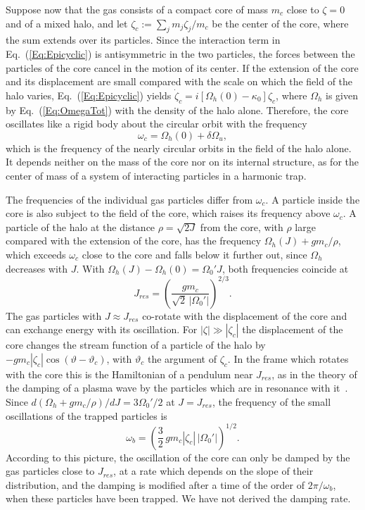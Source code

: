 Suppose now that the gas consists of a compact core of mass $m_c$ close to $\zeta = 0$ and of a mixed halo, and let $\zeta_c := \sum_j m_j\zeta_j/m_c$ be the center of the core, where the sum extends over its particles. Since the interaction term in Eq.~(\ref{Eq:Epicyclic}) is antisymmetric in the two particles, the forces between the particles of the core cancel in the motion of its center. If the extension of the core and its displacement are small compared with the scale on which the field of the halo varies, Eq.~(\ref{Eq:Epicyclic}) yields $\dot{\zeta}_c = i[\Omega_h(0) - \kappa_0]\zeta_c$, where $\Omega_h$ is given by Eq.~(\ref{Eq:OmegaTot}) with the density of the halo alone. Therefore, the core oscillates like a rigid body about the circular orbit with the frequency
\begin{equation}
\omega_c = \Omega_h(0) + \delta\Omega_u,
\label{Eq:omegac}
\end{equation}
which is the frequency of the nearly circular orbits in the field of the halo alone. It depends neither on the mass of the core nor on its internal structure, as for the center of mass of a system of interacting particles in a harmonic trap.

The frequencies of the individual gas particles differ from $\omega_c$. A particle inside the core is also subject to the field of the core, which raises its frequency above $\omega_c$. A particle of the halo at the distance $\rho = \sqrt{2J}$ from the core, with $\rho$ large compared with the extension of the core, has the frequency $\Omega_h(J) + g m_c/\rho$, which exceeds $\omega_c$ close to the core and falls below it further out, since $\Omega_h$ decreases with $J$. With $\Omega_h(J) - \Omega_h(0) = \Omega_0' J$, both frequencies coincide at
\begin{equation}
J_{res} = \left( \frac{g m_c}{\sqrt{2}\,|\Omega_0'|} \right)^{2/3}.
\label{Eq:Jres}
\end{equation}
The gas particles with $J\approx J_{res}$ co-rotate with the displacement of the core and can exchange energy with its oscillation. For $|\zeta|\gg|\zeta_c|$ the displacement of the core changes the stream function of a particle of the halo by $-g m_c|\zeta_c|\cos(\vartheta - \vartheta_c)$, with $\vartheta_c$ the argument of $\zeta_c$. In the frame which rotates with the core this is the Hamiltonian of a pendulum near $J_{res}$, as in the theory of the damping of a plasma wave by the particles which are in resonance with it~\cite{tO65}. Since $d(\Omega_h + g m_c/\rho)/dJ = 3\Omega_0'/2$ at $J = J_{res}$, the frequency of the small oscillations of the trapped particles is
\begin{equation}
\omega_b = \left( \frac{3}{2}\, g m_c |\zeta_c|\, |\Omega_0'| \right)^{1/2}.
\label{Eq:omegab}
\end{equation}
According to this picture, the oscillation of the core can only be damped by the gas particles close to $J_{res}$, at a rate which depends on the slope of their distribution, and the damping is modified after a time of the order of $2\pi/\omega_b$, when these particles have been trapped. We have not derived the damping rate.



